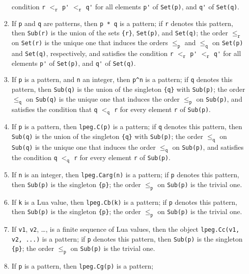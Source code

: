 \documentclass{article}
\begin{document}
\begin{enumerate}
  condition \verb|r| \(<_\mathtt{r}\) \verb|p'| \(<_\mathtt{r}\)
  \verb|q'| for all elements \verb|p'| of \verb|Set(p)|, and \verb|q'|
  of \verb|Set(q)|.
\item If \verb|p| and \verb|q| are patterns, then \verb|p * q| is a
  pattern; if \verb|r| denotes this pattern, then \verb|Sub(r)| is the
  union of the sets \verb|{r}|, \verb|Set(p)|, and \verb|Set(q)|; the
  order \(\leq_\mathtt{r}\) on \verb|Set(r)| is the unique one that
  induces the orders \(\leq_\mathtt{p}\) and \(\leq_\mathtt{q}\) on
  \verb|Set(p)| and \verb|Set(q)|, respectively, and satisfies the
  condition \verb|r| \(<_\mathtt{r}\) \verb|p'| \(<_\mathtt{r}\)
  \verb|q'| for all elements \verb|p'| of \verb|Set(p)|, and \verb|q'|
  of \verb|Set(q)|.
\item If \verb|p| is a pattern, and \verb|n| an integer, then
  \verb|p^n| is a pattern; if \verb|q| denotes this pattern, then
  \verb|Sub(q)| is the union of the singleton \verb|{q}| with
  \verb|Sub(p)|; the order \(\leq_\mathtt{q}\) on \verb|Sub(q)| is the
  unique one that induces the order \(\leq_\mathtt{p}\) on
  \verb|Sub(p)|, and satisfies the condition that \verb|q|
  \(<_\mathtt{q}\) \verb|r| for every element \verb|r| of
  \verb|Sub(p)|.
\item If \verb|p| is a pattern, then \verb|lpeg.C(p)| is a pattern; if
  \verb|q| denotes this pattern, then \verb|Sub(q)| is the union of
  the singleton \verb|{q}| with \verb|Sub(p)|; the order
  \(\leq_\mathtt{q}\) on \verb|Sub(q)| is the unique one that induces
  the order \(\leq_\mathtt{q}\) on \verb|Sub(p)|, and satisfies the
  condition \verb|q| \(<_\mathtt{q}\) \verb|r| for every element
  \verb|r| of \verb|Sub(p)|.
\item If \verb|n| is an integer, then \verb|lpeg.Carg(n)| is a
  pattern; if \verb|p| denotes this pattern, then \verb|Sub(p)| is the
  singleton \verb|{p}|; the order \(\leq_\mathtt{p}\) on \verb|Sub(p)|
  is the trivial one.
\item If \verb|k| is a Lua value, then \verb|lpeg.Cb(k)| is a pattern;
  if \verb|p| denotes this pattern, then \verb|Sub(p)| is the
  singleton \verb|{p}|; the order \(\leq_\mathtt{p}\) on \verb|Sub(p)|
  is the trivial one.
\item If \verb|v1|, \verb|v2|, \dots, is a finite sequence of Lua
  values, then the object \verb|lpeg.Cc(v1, v2, ...)| is a pattern; if
  \verb|p| denotes this pattern, then \verb|Sub(p)| is the singleton
  \verb|{p}|; the order \(\leq_\mathtt{p}\) on \verb|Sub(p)| is the
  trivial one.
\item If \verb|p| is a pattern, then \verb|lpeg.Cg(p)| is a pattern;

\end{enumerate}
\end{document}
